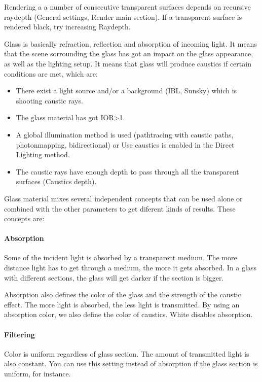 Rendering a a number of consecutive transparent surfaces depends on recursive raydepth (General settings, Render main section). If a transparent surface is rendered black, try increasing Raydepth.

Glass is basically refraction, reflection and absorption of incoming light. It means that the scene sorrounding the glass has got an impact on the glass appearance, as well as the lighting setup. It means that glass will produce caustics if certain conditions are met, which are:

\begin{itemize}
\item There exist a light source and/or a background (IBL, Sunsky) which is shooting caustic rays.
\item The glass material has got IOR>1.
\item A global illumination method is used (pathtracing with caustic paths, photonmapping, bidirectional) or Use caustics is enabled in the Direct Lighting method.
\item The caustic rays have enough depth to pass through all the transparent surfaces (Caustics depth).
\end{itemize}

Glass material mixes several independent concepts that can be used alone or combined with the other parameters to get diferent kinds of results. These concepts are:

\paragraph{Absorption}

Some of the incident light is absorbed by a transparent medium. The more distance light has to get through a medium, the more it gets absorbed. In a glass with different sections, the glass will get darker if the section is bigger.

Absorption also defines the color of the glass and the strength of the caustic effect. The more light is absorbed, the less light is transmitted. By using an absorption color, we also define the color of caustics. White disables absorption.

\paragraph{Filtering}

Color is uniform regardless of glass section. The amount of transmitted light is also constant. You can use this setting instead of absorption if the glass section is uniform, for instance.

